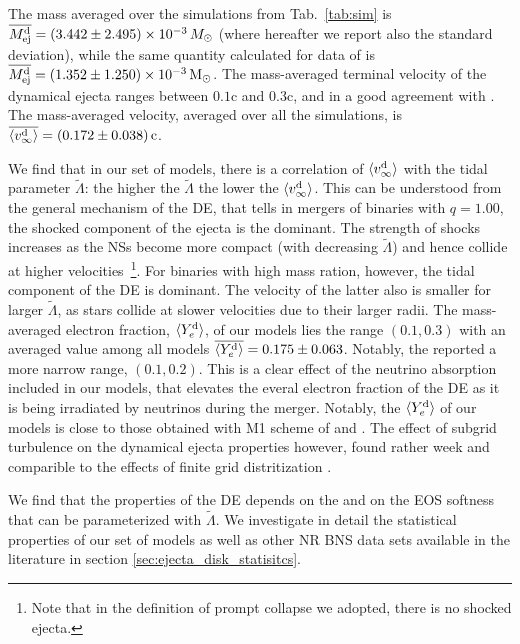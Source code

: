 The mass averaged over the simulations from Tab.~\ref{tab:sim} is 
$\overline{M^{\text{d}}_{\text{ej}}} = (3.442 \pm 2.495)\times 10^{-3}\,M_{\odot}$ (where
hereafter we report also the standard deviation), while the same
quantity calculated for data of \cite{Radice:2018pdn} 
is $\overline{M^{\text{d}}_{\text{ej}}} = (1.352\pm 1.250)\times 10^{-3}\,{\text{M}_{\odot}}$.
The mass-averaged terminal velocity of the dynamical ejecta 
ranges between $0.1$c and $0.3$c, and in a good agreement with 
\cite{Radice:2018pdn}.
The mass-averaged velocity, averaged over all the simulations, is 
$\overline{\langle v^{\text{d}}_\infty\rangle} = (0.172\pm0.038)\,{\text{c}}$.

We find that in our set of models, there is a correlation of $\langle v^{\text{d}}_\infty\rangle$ with the tidal parameter 
$\tilde{\Lambda}$: the higher the $\tilde{\Lambda}$ the lower the $\langle v^{\text{d}}_\infty\rangle$.
This can be understood from the general mechanism of the \ac{DE},
that tells in mergers of binaries with $q=1.00$, the shocked component of the ejecta 
is the dominant. The strength of shocks increases as the \acp{NS} become more compact 
(with decreasing $\tilde{\Lambda}$) and hence collide at higher velocities~\footnote{Note that in the definition of prompt collapse we adopted, there is no shocked ejecta.}.
For binaries with high mass ration, however, the tidal component of the \ac{DE} is dominant. 
The velocity of the latter also is smaller for larger $\tilde{\Lambda}$, as stars collide 
at slower velocities due to their larger radii. 
The mass-averaged electron fraction, $\langle Y^{\text{d}}_{e}\rangle$, of our models lies the range $(0.1, 0.3)$
with an averaged value among all models $\overline{\langle Y^{\text{d}}_{e}\rangle} = 0.175 \pm 0.063$.
Notably, the \citet{Radice:2018pdn} reported a more narrow range, $(0.1, 0.2)$.
This is a clear effect of the neutrino absorption included in our models, that elevates 
the everal electron fraction of the \ac{DE} as it is being irradiated by neutrinos 
during the merger.
Notably, the $\langle Y^{\text{d}}_{e}\rangle$ of our models is close to those obtained with M1 
scheme of \citet{Sekiguchi:2016bjd} and \citet{Vincent:2019kor}.
The effect of subgrid turbulence on the dynamical ejecta properties however,
found rather week and comparible to the effects of finite grid distritization 
\citep{Bernuzzi:2020txg,Radice:2020ids}.

We find that the properties of the \ac{DE} depends on the \mr{} and on the 
\ac{EOS} softness that can be parameterized with $\tilde{\Lambda}$. 
We investigate in detail the statistical properties of our set of models as well as 
other \ac{NR} \ac{BNS} data sets available in the literature in 
section \ref{sec:ejecta_disk_statisitcs}.



